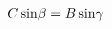 \documentclass[preview]{standalone}
\begin{document}
\begin{align*}
C \, {\rm sin} \beta = B \, {\rm sin} \gamma
\end{align*}
\end{document}
